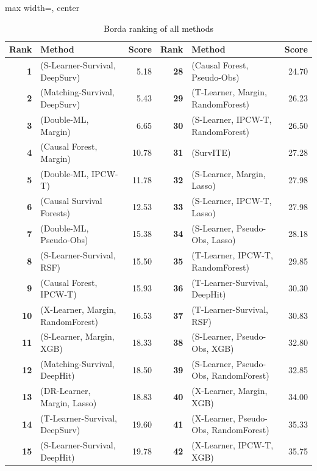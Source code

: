\documentclass{article} %
\newcommand{\rebuttal}[1]{\textcolor{black}{#1}}
\begin{document}
\begin{table}[ht]
\centering
\caption{\rebuttal{Borda ranking of all methods}} \label{tab:borda-rank-all-method}
\begin{adjustbox}{max width=\textwidth, center}
\begin{tabular}{rlr@{\hskip 24pt}rlr}
\toprule
\textbf{Rank} & \textbf{Method} & \textbf{Score} & \textbf{Rank} & \textbf{Method} & \textbf{Score} \\
\midrule
\textbf{1}  & (S-Learner-Survival, DeepSurv) & 5.18  & \textbf{28} & (Causal Forest, Pseudo-Obs) & 24.70 \\
\textbf{2}  & (Matching-Survival, DeepSurv) & 5.43  & \textbf{29} & (T-Learner, Margin, RandomForest) & 26.23 \\
\textbf{3}  & (Double-ML, Margin) & 6.65  & \textbf{30} & (S-Learner, IPCW-T, RandomForest) & 26.50 \\
\textbf{4}  & (Causal Forest, Margin) & 10.78 & \textbf{31} & (SurvITE) & 27.28 \\
\textbf{5}  & (Double-ML, IPCW-T) & 11.78 & \textbf{32} & (S-Learner, Margin, Lasso) & 27.98 \\
\textbf{6}  & (Causal Survival Forests) & 12.53 & \textbf{33} & (S-Learner, IPCW-T, Lasso) & 27.98 \\
\textbf{7}  & (Double-ML, Pseudo-Obs) & 15.38 & \textbf{34} & (S-Learner, Pseudo-Obs, Lasso) & 28.18 \\
\textbf{8}  & (S-Learner-Survival, RSF) & 15.50 & \textbf{35} & (T-Learner, IPCW-T, RandomForest) & 29.85 \\
\textbf{9}  & (Causal Forest, IPCW-T) & 15.93 & \textbf{36} & (T-Learner-Survival, DeepHit) & 30.30 \\
\textbf{10} & (X-Learner, Margin, RandomForest) & 16.53 & \textbf{37} & (T-Learner-Survival, RSF) & 30.83 \\
\textbf{11} & (S-Learner, Margin, XGB) & 18.33 & \textbf{38} & (S-Learner, Pseudo-Obs, XGB) & 32.80 \\
\textbf{12} & (Matching-Survival, DeepHit) & 18.50 & \textbf{39} & (S-Learner, Pseudo-Obs, RandomForest) & 32.85 \\
\textbf{13} & (DR-Learner, Margin, Lasso) & 18.83 & \textbf{40} & (X-Learner, Margin, XGB) & 34.00 \\
\textbf{14} & (T-Learner-Survival, DeepSurv) & 19.60 & \textbf{41} & (X-Learner, Pseudo-Obs, RandomForest) & 35.33 \\
\textbf{15} & (S-Learner-Survival, DeepHit) & 19.78 & \textbf{42} & (X-Learner, IPCW-T, XGB) & 35.75 \\

\end{tabular}
\end{adjustbox}
\end{table}
\end{document}
